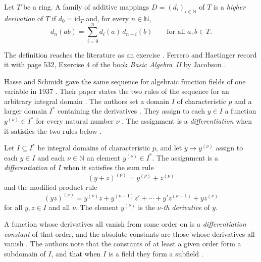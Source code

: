 \begin{definition}\label{def:higher:hd}
Let $T$ be a ring. A family of additive mappings
$D=(d_i)_{i\in\mathbb{N}}$ of $T$ is a \emph{higher derivation} of $T$ if
$d_0=\mathrm{id}_T$ and, for every $n\in\mathbb{N}$,
\begin{equation*}
d_n(ab)=\sum_{i=0}^{n} d_i(a)\,d_{n-i}(b)
\qquad\text{for all }a,b\in T.
\end{equation*}
\end{definition}

The definition reaches the literature as an exercise
\cite[p.~2323]{FerreroHaetinger2002}. Ferrero and Haetinger record it with
page 532, Exercise 4 of the book \emph{Basic Algebra~II} by Jacobson
\cite[p.~2323]{FerreroHaetinger2002}.

Hasse and Schmidt gave the same sequence for algebraic function fields of one
variable in 1937 \cite[pp.~215--223]{HasseSchmidt1937}. Their paper states the
two rules of the sequence for an arbitrary integral domain
\cite[pp.~223--224]{HasseSchmidt1937}. The authors set a domain $I$ of
characteristic $p$ and a larger domain $I^{*}$ containing the derivatives
\cite[p.~224]{HasseSchmidt1937}. They assign to each $y\in I$ a function
$y^{(\nu)}\in I^{*}$ for every natural number $\nu$
\cite[p.~224]{HasseSchmidt1937}. The assignment is a \emph{differentiation}
when it satisfies the two rules below \cite[p.~224]{HasseSchmidt1937}.

\begin{definition}\label{def:higher:hsrules}
Let $I\subseteq I^{*}$ be integral domains of characteristic $p$, and let
$y\mapsto y^{(\nu)}$ assign to each $y\in I$ and each $\nu\in\mathbb{N}$ an
element $y^{(\nu)}\in I^{*}$. The assignment is a \emph{differentiation} of
$I$ when it satisfies the sum rule
\[
(y+z)^{(\nu)}=y^{(\nu)}+z^{(\nu)}
\]
and the modified product rule
\[
(yz)^{(\nu)}=y^{(\nu)}z+y^{(\nu-1)}z'+\cdots+y'z^{(\nu-1)}+yz^{(\nu)}
\]
for all $y,z\in I$ and all $\nu$. The element $y^{(\nu)}$ is the
\emph{$\nu$-th derivative} of $y$.
\end{definition}

A function whose derivatives all vanish from some order on is a
\emph{differentiation constant} of that order, and the absolute constants are
those whose derivatives all vanish \cite[p.~224]{HasseSchmidt1937}. The authors
note that the constants of at least a given order form a subdomain of $I$, and
that when $I$ is a field they form a subfield
\cite[p.~224]{HasseSchmidt1937}.

